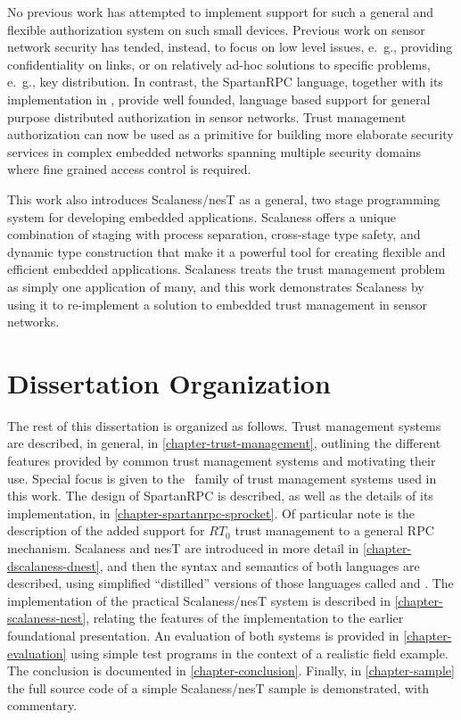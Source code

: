 No previous work has attempted to implement support for such a general and flexible
authorization system on such small devices. Previous work on sensor network security has tended,
instead, to focus on low level issues, e.~g., providing confidentiality on links, or on
relatively ad-hoc solutions to specific problems, e.~g., key distribution. In contrast, the
SpartanRPC language, together with its implementation in \Sprocket, provide well founded,
language based support for general purpose distributed authorization in sensor networks. Trust
management authorization can now be used as a primitive for building more elaborate security
services in complex embedded networks spanning multiple security domains where fine grained
access control is required.

This work also introduces Scalaness/nesT as a general, two stage programming system for
developing embedded applications. Scalaness offers a unique combination of staging with process
separation, cross-stage type safety, and dynamic type construction that make it a powerful tool
for creating flexible and efficient embedded applications. Scalaness treats the trust management
problem as simply one application of many, and this work demonstrates Scalaness by using it to
re-implement a solution to embedded trust management in sensor networks.

\section{Dissertation Organization}

The rest of this dissertation is organized as follows. Trust management systems are described,
in general, in \autoref{chapter-trust-management}, outlining the different features provided by
common trust management systems and motivating their use. Special focus is given to the \RT\
family of trust management systems used in this work. The design of SpartanRPC is described, as
well as the details of its implementation, in \autoref{chapter-spartanrpc-sprocket}. Of
particular note is the description of the added support for $RT_0$ trust management to a general
RPC mechanism. Scalaness and nesT are introduced in more detail in
\autoref{chapter-dscalaness-dnest}, and then the syntax and semantics of both languages are
described, using simplified ``distilled'' versions of those languages called
\newterm{DScalaness} and \newterm{DnesT}. The implementation of the practical Scalaness/nesT
system is described in \autoref{chapter-scalaness-nest}, relating the features of the
implementation to the earlier foundational presentation. An evaluation of both systems is
provided in \autoref{chapter-evaluation} using simple test programs in the context of a
realistic field example. The conclusion is documented in \autoref{chapter-conclusion}. Finally,
in \autoref{chapter-sample} the full source code of a simple Scalaness/nesT sample is
demonstrated, with commentary.

